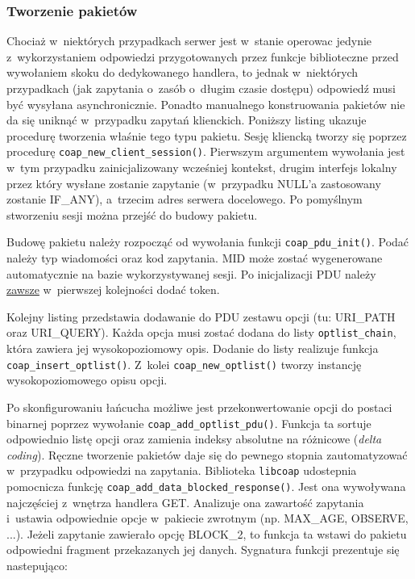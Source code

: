 
\subsubsection{Tworzenie pakietów}

Chociaż w~niektórych przypadkach serwer jest w~stanie operowac jedynie z~wykorzystaniem odpowiedzi przygotowanych przez funkcje biblioteczne przed wywołaniem skoku do dedykowanego handlera, to jednak w~niektórych przypadkach (jak zapytania o~zasób o~długim czasie dostępu) odpowiedź musi być wysyłana asynchronicznie. Ponadto manualnego konstruowania pakietów nie da się uniknąć w~przypadku zapytań klienckich. Poniższy listing ukazuje procedurę tworzenia właśnie tego typu pakietu. Sesję kliencką tworzy się poprzez procedurę \verb|coap_new_client_session()|. Pierwszym argumentem wywołania jest w~tym przypadku zainicjalizowany wcześniej kontekst, drugim interfejs lokalny przez który wysłane zostanie zapytanie (w~przypadku NULL'a zastosowany zostanie IF\_ANY), a~trzecim adres serwera docelowego. Po pomyślnym stworzeniu sesji można przejść do budowy pakietu.

\vspace{0.5cm}

\vspace{0.5cm}

Budowę pakietu należy rozpocząć od wywołania funkcji \verb|coap_pdu_init()|. Podać należy typ wiadomości oraz kod zapytania. MID może zostać wygenerowane automatycznie na bazie wykorzystywanej sesji. Po inicjalizacji PDU należy \underline{zawsze} w~pierwszej kolejności dodać token.

Kolejny listing przedstawia dodawanie do PDU zestawu opcji (tu: URI\_PATH oraz URI\_QUERY). Każda opcja musi zostać dodana do listy \verb|optlist_chain|, która zawiera jej wysokopoziomowy opis. Dodanie do listy realizuje funkcja \verb|coap_insert_optlist()|. Z~kolei \verb|coap_new_optlist()| tworzy instancję wysokopoziomowego opisu opcji.

\vspace{0.5cm}

\vspace{0.5cm}

Po skonfigurowaniu łańcucha możliwe jest przekonwertowanie opcji do postaci binarnej poprzez wywołanie \verb|coap_add_optlist_pdu()|. Funkcja ta sortuje odpowiednio listę opcji oraz zamienia indeksy absolutne na różnicowe (\textit{delta coding}). Ręczne tworzenie pakietów daje się do pewnego stopnia zautomatyzować w~przypadku odpowiedzi na zapytania. Biblioteka \verb|libcoap| udostepnia pomocnicza funkcję \verb|coap_add_data_blocked_response()|. Jest ona wywoływana najczęściej z~wnętrza handlera GET. Analizuje ona zawartość zapytania i~ustawia odpowiednie opcje w~pakiecie zwrotnym (np. MAX\_AGE, OBSERVE, ...). Jeżeli zapytanie zawierało opcję BLOCK\_2, to funkcja ta wstawi do pakietu odpowiedni fragment przekazanych jej danych. Sygnatura funkcji prezentuje się nastepująco:

